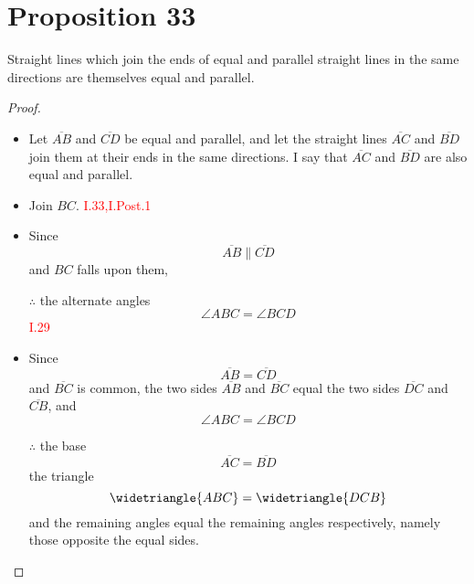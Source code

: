 \section{Proposition 33}

\begin{thm}
Straight lines which join the ends of equal and parallel straight lines in the same directions are themselves equal and parallel.
\end{thm}

\begin{proof}

\begin{itemize}

\item[]

\item Let $\overline{AB}$ and $\overline{CD}$ be equal and parallel, and let the straight lines $\overline{AC}$ and $\overline{BD}$ join them at their ends in the same directions.
I say that $\overline{AC}$ and $\overline{BD}$ are also equal and parallel.

\item Join $BC$. \hfill\textcolor{red}{I.33,I.Post.1}

\begin{figure}[H]
	\caption{}
\end{figure}

\item Since 
\[\overline{AB} \parallel \overline{CD}\] 
and $BC$ falls upon them, 

\item[$\therefore$] the alternate angles 
\[\angle{ABC} = \angle {BCD}\] \hfill\textcolor{red}{I.29}

\item Since 
\[\overline{AB} = \overline{CD}\] 
and $\overline{BC}$ is common, the two sides $\overline{AB}$ and $\overline{BC}$ equal the two sides $\overline{DC}$ and $\overline{CB}$, and 
\[\angle{ABC} = \angle{BCD}\]

\item[$\therefore$] the base 
\[\overline{AC} = \overline{BD}\] 
the triangle 
\[\widetriangle{ABC} = \widetriangle{DCB}\] 
and the remaining angles equal the remaining angles respectively, namely those opposite the equal sides. 


\end{itemize}
\end{proof}
